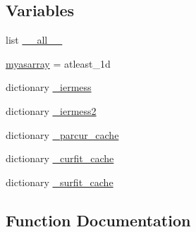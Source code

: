 \subsection*{Variables}
\begin{DoxyCompactItemize}
\item 
list \hyperlink{namespacescipy_1_1interpolate_1_1fitpack_a65eee9893ce579b310317b8f067ced11}{\+\_\+\+\_\+all\+\_\+\+\_\+}
\item 
\hyperlink{namespacescipy_1_1interpolate_1_1fitpack_a4ad199da16b4d798a68f31962ef1ea64}{myasarray} = atleast\+\_\+1d
\item 
dictionary \hyperlink{namespacescipy_1_1interpolate_1_1fitpack_ab6715f34ca1201bfec232435cb6095d6}{\+\_\+iermess}
\item 
dictionary \hyperlink{namespacescipy_1_1interpolate_1_1fitpack_a234ed1709b55f5bbbb71855eb4f4f140}{\+\_\+iermess2}
\item 
dictionary \hyperlink{namespacescipy_1_1interpolate_1_1fitpack_a3793e6fff4a587159825ea08f6687c8f}{\+\_\+parcur\+\_\+cache}
\item 
dictionary \hyperlink{namespacescipy_1_1interpolate_1_1fitpack_a069ddb97291502837e31c6360a10a8e8}{\+\_\+curfit\+\_\+cache}
\item 
dictionary \hyperlink{namespacescipy_1_1interpolate_1_1fitpack_addb72cc2d4e6140eb233f29c2d19fc7c}{\+\_\+surfit\+\_\+cache}
\end{DoxyCompactItemize}


\subsection{Function Documentation}
\hypertarget{namespacescipy_1_1interpolate_1_1fitpack_acaf6a631cf8ff9bd445bd79a7cd2a364}{}
